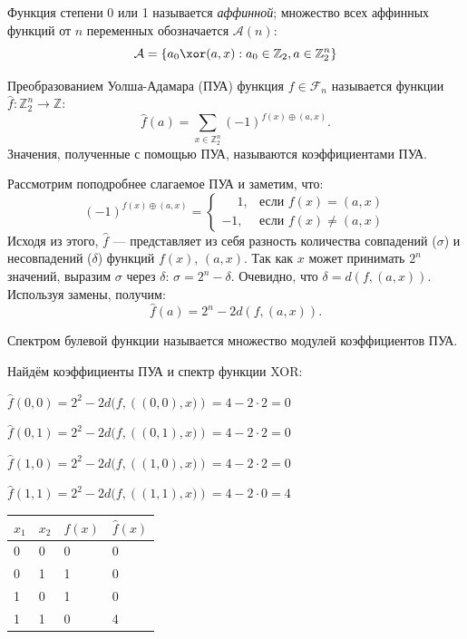     Функция степени 0 или 1 называется \textit{аффинной}; множество всех аффинных функций от $n$ переменных обозначается $\mathcal{A}(n)$:
    \[
    \mathcal{A} = \{a_0 \xor (a,x): a_0 \in \mathbb{Z}_2, a \in \mathbb{Z}_2^n\}
    \]

\begin{definition}
    Преобразованием Уолша-Адамара (ПУА) функция $f \in \mathcal{F}_n$ называется функции $\hat{f}: \mathbb{Z}_2^n \rightarrow \mathbb{Z}$:
    \[
    \hat{f}(a) = \sum_{x \in \mathbb{Z}_2^n} (-1)^{f(x) \oplus (a,x)}.
    \]
    Значения, полученные с помощью ПУА, называются коэффициентами ПУА.
\end{definition}
Рассмотрим поподробнее слагаемое ПУА и заметим, что:
\[
    (-1)^{f(x) \oplus (a,x)} = 
    \begin{cases}
    \phantom{-}1, & \text{если } f(x) = (a,x) \\
    -1, & \text{если } f(x) \neq  (a,x)
    \end{cases}
\]
Исходя из этого, $\hat{f}$ — представляет из себя разность количества совпадений ($\sigma$) и несовпадений ($\delta$) функций $f(x)$, $(a,x)$. Так как $x$ может принимать $2^n$ значений, выразим $\sigma$ через $\delta$: $\sigma = 2^n - \delta$. Очевидно, что $\delta = d(f, (a,x))$.
Используя замены, получим:
\[
    \hat{f}(a) =  2^n - 2d(f,(a,x)).
\]
\begin{definition}
    Спектром булевой функции называется множество модулей коэффициентов ПУА.  
\end{definition}
\begin{example} Найдём коэффициенты ПУА и спектр функции XOR:
\begin{center}
    

$\hat{f}(0,0) = 2^2 -2d(f,\left((0,0),x)\right) = 4 - 2\cdot2 = 0$

$\hat{f}(0,1) = 2^2 -2d(f,\left((0,1),x)\right) = 4 - 2\cdot2 = 0$

$\hat{f}(1,0) = 2^2 -2d(f,\left((1,0),x)\right) = 4 - 2\cdot2 = 0$

$\hat{f}(1,1) = 2^2 -2d(f,\left((1,1),x)\right) = 4 - 2\cdot0 = 4$ \\
\end{center}
\begin{center}
    \renewcommand{\arraystretch}{0.8}
    \begin{tabular}{ll|l|l}
    $x_1$ & $x_2$ & $f(x)$ & $\hat{f}(x)$ \\ \hline
    0  & 0  & 0    & 0    \\
    0  & 1  & 1    & 0    \\
    1  & 0  & 1    & 0    \\
    1  & 1  & 0    & 4    \\
    \end{tabular}
    \end{center}

\end{example}

